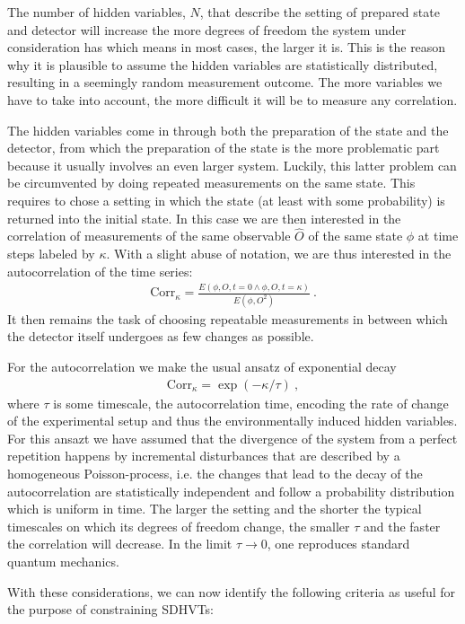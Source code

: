 \documentclass{svjour2}                    %
\newcommand{\beqn}{\begin{eqnarray}}
\newcommand{\eeqn}{\end{eqnarray}}
\begin{document}
The number of hidden variables, $N$, that describe the setting of prepared state and detector
will increase the more degrees of freedom the system under consideration has which means
in most cases, the larger it is. This is the reason
why it is plausible to assume the hidden variables are statistically distributed,
resulting in a seemingly random measurement outcome. The more variables we have to
take into account, the more difficult it will be to measure any correlation. 

The
hidden variables come in through both the preparation of the state and the detector,
from which the preparation of the state is the more problematic part because it
usually involves an even larger system. Luckily, this latter problem can be circumvented
by doing repeated measurements on the same state. This requires to chose a setting
in which the state (at least with some probability) is returned into the initial state.
In this case we are then interested in the correlation of measurements of the
same observable $\hat O$ of the same state $\phi$ at time steps labeled by $\kappa$.
With a slight abuse of notation, we are thus interested in the autocorrelation of
the time series:
\beqn
{\mathrm{Corr}}_\kappa = \frac{E(\phi, O, t=0 \wedge \phi, O, t=\kappa )}{E(\phi, O^2)}~.
\eeqn
It then remains the task of
choosing repeatable measurements in between which the detector itself undergoes as few 
changes as possible. 

For the autocorrelation we make the usual ansatz of exponential decay
\beqn
{\mathrm{Corr}}_\kappa = \exp \left( - \kappa/\tau \right) ~,
\eeqn
where $\tau$ is some timescale, the autocorrelation time, encoding the rate of change of the experimental
setup and thus the environmentally induced hidden variables. For this ansazt we have assumed that the
divergence of the system from a perfect repetition happens by incremental disturbances that are described 
by a homogeneous Poisson-process, i.e. the changes that lead to the decay of the autocorrelation 
are statistically independent and follow a probability distribution
which is uniform in time. The larger the setting and the shorter the typical timescales on which its degrees of freedom change, 
the smaller $\tau$ and the faster the correlation will decrease. In the limit $\tau \to 0$,
one reproduces standard quantum mechanics. 

With these considerations, we can now identify the following criteria as useful for the 
purpose of constraining {\sc SDHVT}s:
\end{document}
